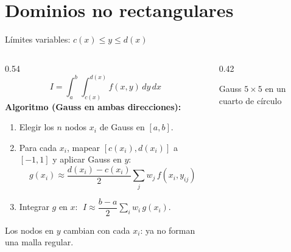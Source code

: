 \documentclass[aspectratio=169,10pt]{beamer}
\begin{document}
\section{Dominios no rectangulares}
\begin{frame}{L\'imites variables: $c(x)\le y\le d(x)$}
\begin{columns}[T]
\begin{column}{0.54\textwidth}
\small
\[
I=\int_a^b\int_{c(x)}^{d(x)} f(x,y)\,dy\,dx
\]
\textbf{Algoritmo (Gauss en ambas direcciones):}
\begin{enumerate}
\item Elegir los $n$ nodos $x_i$ de Gauss en $[a,b]$.
\item Para cada $x_i$, mapear $[c(x_i),d(x_i)]$ a $[-1,1]$ y aplicar Gauss en $y$:
\[
g(x_i)\approx\frac{d(x_i)-c(x_i)}{2}\sum_j w_j\,f(x_i,y_{ij})
\]
\item Integrar $g$ en $x$: $\;I\approx\dfrac{b-a}{2}\sum_i w_i\,g(x_i)$.
\end{enumerate}
Los nodos en $y$ \alert{cambian con cada $x_i$}: ya no forman una malla regular.
\end{column}
\begin{column}{0.42\textwidth}
\centering
{}
\par{\scriptsize Gauss $5\times5$ en un cuarto de c\'irculo}
\end{column}
\end{columns}
\end{frame}
\end{document}
